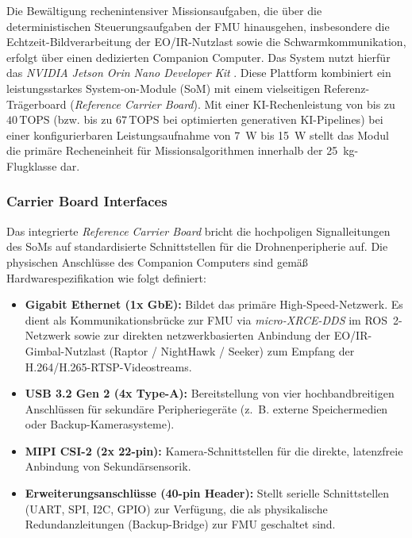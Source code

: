 Die Bewältigung rechenintensiver Missionsaufgaben, die über die deterministischen Steuerungsaufgaben der FMU hinausgehen, insbesondere die Echtzeit-Bildverarbeitung der EO/IR-Nutzlast sowie die Schwarmkommunikation, 
erfolgt über einen dedizierten Companion Computer. Das System nutzt hierfür das \textit{NVIDIA Jetson Orin Nano Developer Kit} \cite{nvidia_jetson_orin_nano}. Diese Plattform kombiniert ein leistungsstarkes System-on-Module (SoM) 
mit einem vielseitigen Referenz-Trägerboard (\textit{Reference Carrier Board}). Mit einer KI-Rechenleistung von bis zu $40\,\text{TOPS}$ (bzw. bis zu $67\,\text{TOPS}$ bei optimierten generativen KI-Pipelines) 
bei einer konfigurierbaren Leistungsaufnahme von \SI{7}{\W} bis \SI{15}{\W} stellt das Modul die primäre Recheneinheit für Missionsalgorithmen innerhalb der \SI{25}{\kg}-Flugklasse dar.

\subsubsection{Carrier Board Interfaces}
\label{sec:carrier_board_interfaces}

Das integrierte \textit{Reference Carrier Board} bricht die hochpoligen Signalleitungen des SoMs auf standardisierte Schnittstellen für die Drohnenperipherie auf. 
Die physischen Anschlüsse des Companion Computers sind gemäß Hardwarespezifikation \cite{nvidia_jetson_orin_nano} wie folgt definiert:
\begin{itemize}
    \item \textbf{Gigabit Ethernet (1x GbE):} Bildet das primäre High-Speed-Netzwerk. Es dient als Kommunikationsbrücke zur FMU via \textit{micro-XRCE-DDS} im ROS~2-Netzwerk sowie zur direkten netzwerkbasierten Anbindung der EO/IR-Gimbal-Nutzlast 
                                              (Raptor / NightHawk / Seeker) zum Empfang der H.264/H.265-RTSP-Videostreams.
    \item \textbf{USB 3.2 Gen 2 (4x Type-A):} Bereitstellung von vier hochbandbreitigen Anschlüssen für sekundäre Peripheriegeräte (z.~B. externe Speichermedien oder Backup-Kamerasysteme).
    \item \textbf{MIPI CSI-2 (2x 22-pin):} Kamera-Schnittstellen für die direkte, latenzfreie Anbindung von Sekundärsensorik.
    \item \textbf{Erweiterungsanschlüsse (40-pin Header):} Stellt serielle Schnittstellen (UART, SPI, I2C, GPIO) zur Verfügung, die als physikalische Redundanzleitungen (Backup-Bridge) zur FMU geschaltet sind.
\end{itemize}

